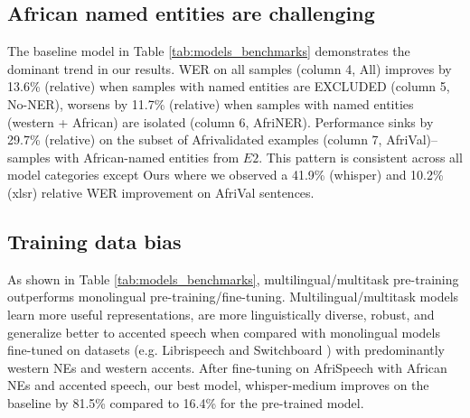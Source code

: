 \documentclass{INTERSPEECH2023}
\begin{document}
\subsection{African named entities are challenging}
The baseline model in Table \ref{tab:models_benchmarks} demonstrates the dominant trend in our results. WER on all samples (column 4, All) improves by 13.6\% (relative) when samples with named entities are EXCLUDED (column 5, No-NER), worsens by 11.7\% (relative) when samples with named entities (western + African) are isolated (column 6, AfriNER). Performance sinks by 29.7\% (relative) on the subset of Afrivalidated examples (column 7, AfriVal)-- samples with African-named entities from $E2$. This pattern is consistent across all model categories except Ours where we observed a 41.9\% (whisper) and 10.2\% (xlsr) relative WER improvement on AfriVal sentences.

\subsection{Training data bias} 
As shown in Table \ref{tab:models_benchmarks}, multilingual/multitask pre-training outperforms monolingual pre-training/fine-tuning. Multilingual/multitask models \cite{radford2022robust, grosman2021xlsr53-large-english, gulati2020conformer} learn more useful representations, are more linguistically diverse, robust, and generalize better to accented speech when compared with monolingual models fine-tuned on datasets (e.g. Librispeech  \cite{panayotov2015librispeech} and Switchboard \cite{godfrey1992switchboard}) with predominantly western NEs and western accents. After fine-tuning on AfriSpeech with African NEs and accented speech, our best model, whisper-medium improves on the baseline by 81.5\% compared to 16.4\% for the pre-trained model.


\end{document}
